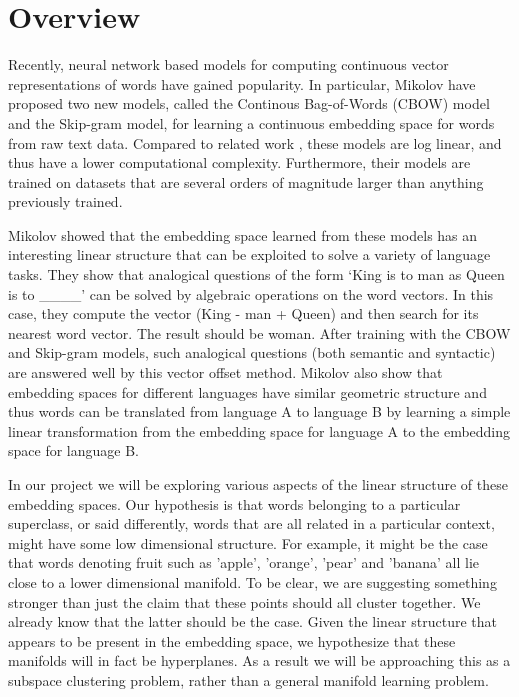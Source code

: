 \section{Overview}\label{sec:overview}

Recently, neural network based models for computing continuous vector representations of words have gained popularity. 
In particular, Mikolov \etal \cite{mikolov1, mikolov2} have proposed two new models, called the Continous Bag-of-Words (CBOW) model and the Skip-gram model, for learning a continuous embedding space for words from raw text data. 
Compared to related work \cite{bengio,mikolov5}, these models are log linear, and thus have a lower computational complexity. 
Furthermore, their models are trained on datasets that are several orders of magnitude larger than anything previously trained.
 
Mikolov \etal \cite{mikolov3} showed that the embedding space learned from these models has an interesting linear structure that can be exploited to solve a variety of language tasks. 
They show that analogical questions of the form `King is to man as Queen is to \_\_\_\_' can be solved by algebraic operations on the word vectors. 
In this case, they compute the vector (King - man + Queen) and then search for its nearest word vector. 
The result should be woman. 
After training with the CBOW and Skip-gram models, such analogical questions (both semantic and syntactic) are answered well by this vector offset method. 
Mikolov \etal \cite{mikolov4} also show that embedding spaces for different languages  have similar geometric structure and thus words can be translated from language A to language B by learning a simple linear transformation from the embedding space for language A to the embedding space for language B.
 
In our project we will be exploring various aspects of the linear structure of these embedding spaces. 
Our hypothesis is that words belonging to a particular superclass, or said differently, words that are all related in a particular context, might have some low dimensional structure. 
For example, it might be the case that words denoting fruit such as 'apple', 'orange', 'pear' and 'banana' all lie close to a lower dimensional manifold. 
To be clear, we are suggesting something stronger than just the claim that these points should all cluster together. 
We already know that the latter should be the case. 
Given the linear structure that appears to be present in the embedding space, we hypothesize that these manifolds will in fact be hyperplanes. 
As a result we will be approaching this as a subspace clustering problem, rather than a general manifold learning problem.
